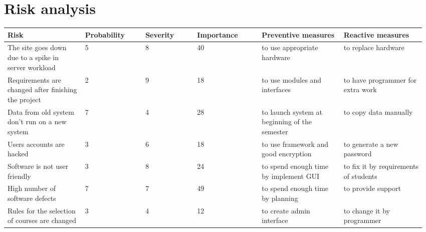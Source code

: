 \section{Risk analysis}
\par
\begin{tabular}{|p{0.18\linewidth} |p{0.14\linewidth}| p{0.12\linewidth}| p{0.15\linewidth}| p{0.19\linewidth}| p{0.19\linewidth}|}
\hline
 \textbf{Risk} & \textbf{Probability}                          & \textbf{Severity}                           & \textbf{Importance}                             & \textbf{Preventive measures}                & \textbf{Reactive measures}                   \\ 
   \hline
 The site goes down due to a spike in server workload & 5                              & 8                            & 40                             & to use appropriate hardware                  & to replace hardware                   \\
 \hline
Requirements are changed after finishing the project & 2                              & 9                            & 18                             & to use modules and interfaces                & to have programmer for extra work     \\
\hline
Data from old system don't run on a new system       & 7                              & 4                            & 28                             & to launch system at beginning of the semester & to copy data manually                 \\
\hline
Users accounts are hacked                            & 3                              & 6                            & 18                             & to use framework and good encryption         & to generate a new password            \\
\hline
Software is not user friendly                        & 3                              & 8                            & 24                              & to spend enough time by implement GUI        & to fix it by requirements of students \\
\hline
High number of software defects                      & 7                              & 7                            & 49                             & to spend enough time by planning             & to provide support                    \\
\hline
Rules for the selection of courses are changed       & 3                              & 4                            & 12                             & to create admin interface                    & to change it by programmer  \\ 
\hline
\end{tabular}